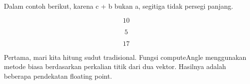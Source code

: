 \documentclass[12pt,Times new roman,letterpaper]{book}
\begin{document}
\begin{eulernootebook}
\begin{eulercomment}
\begin{eulercomment}
\begin{eulernootebook}
\begin{eulercomment}
\begin{eulercomment}
\begin{eulercomment}
\begin{eulercomment}
\begin{eulercomment}
\begin{eulercomment}
\begin{eulernotebook}
\begin{eulercomment}
\begin{eulercomment}
\begin{eulercomment}
\begin{eulercomment}
Dalam contoh berikut, karena c + b bukan a, segitiga tidak persegi
panjang.
\end{eulercomment}
\begin{eulerformula}
\[
10
\]
\end{eulerformula}
\begin{eulerformula}
\[
5
\]
\end{eulerformula}
\begin{eulerformula}
\[
17
\]
\end{eulerformula}
\begin{eulercomment}
Pertama, mari kita hitung sudut tradisional. Fungsi computeAngle
menggunakan metode biasa berdasarkan perkalian titik dari dua vektor.
Hasilnya adalah beberapa pendekatan floating point.



\end{eulercomment}
\end{eulercomment}
\end{eulercomment}
\end{eulercomment}
\end{eulernotebook}
\end{eulercomment}
\end{eulercomment}
\end{eulercomment}
\end{eulercomment}
\end{eulercomment}
\end{eulercomment}
\end{eulernootebook}
\end{eulercomment}
\end{eulercomment}
\end{eulernootebook}
\end{document}
